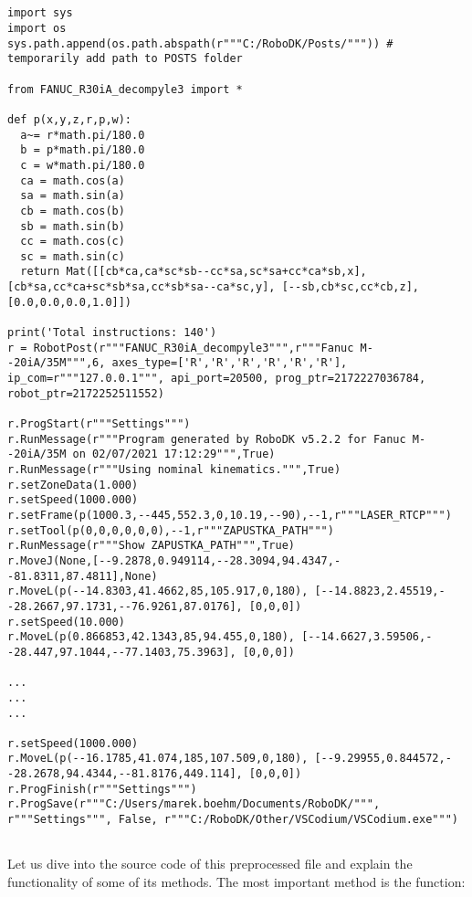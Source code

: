 \begin{lstlisting}[numbers=none,caption={Code snippet of preprocessed program to be executed by post processor},captionpos=b,label={code:preprocessed_python}, language={}]


import sys
import os
sys.path.append(os.path.abspath(r"""C:/RoboDK/Posts/""")) # temporarily add path to POSTS folder

from FANUC_R30iA_decompyle3 import *

def p(x,y,z,r,p,w):
  a~= r*math.pi/180.0
  b = p*math.pi/180.0
  c = w*math.pi/180.0
  ca = math.cos(a)
  sa = math.sin(a)
  cb = math.cos(b)
  sb = math.sin(b)
  cc = math.cos(c)
  sc = math.sin(c)
  return Mat([[cb*ca,ca*sc*sb--cc*sa,sc*sa+cc*ca*sb,x], [cb*sa,cc*ca+sc*sb*sa,cc*sb*sa--ca*sc,y], [--sb,cb*sc,cc*cb,z], [0.0,0.0,0.0,1.0]])

print('Total instructions: 140')
r = RobotPost(r"""FANUC_R30iA_decompyle3""",r"""Fanuc M--20iA/35M""",6, axes_type=['R','R','R','R','R','R'], ip_com=r"""127.0.0.1""", api_port=20500, prog_ptr=2172227036784, robot_ptr=2172252511552)

r.ProgStart(r"""Settings""")
r.RunMessage(r"""Program generated by RoboDK v5.2.2 for Fanuc M--20iA/35M on 02/07/2021 17:12:29""",True)
r.RunMessage(r"""Using nominal kinematics.""",True)
r.setZoneData(1.000)
r.setSpeed(1000.000)
r.setFrame(p(1000.3,--445,552.3,0,10.19,--90),--1,r"""LASER_RTCP""")
r.setTool(p(0,0,0,0,0,0),--1,r"""ZAPUSTKA_PATH""")
r.RunMessage(r"""Show ZAPUSTKA_PATH""",True)
r.MoveJ(None,[--9.2878,0.949114,--28.3094,94.4347,--81.8311,87.4811],None)
r.MoveL(p(--14.8303,41.4662,85,105.917,0,180), [--14.8823,2.45519,--28.2667,97.1731,--76.9261,87.0176], [0,0,0])
r.setSpeed(10.000)
r.MoveL(p(0.866853,42.1343,85,94.455,0,180), [--14.6627,3.59506,--28.447,97.1044,--77.1403,75.3963], [0,0,0])

...
...
...

r.setSpeed(1000.000)
r.MoveL(p(--16.1785,41.074,185,107.509,0,180), [--9.29955,0.844572,--28.2678,94.4344,--81.8176,449.114], [0,0,0])
r.ProgFinish(r"""Settings""")
r.ProgSave(r"""C:/Users/marek.boehm/Documents/RoboDK/""", r"""Settings""", False, r"""C:/RoboDK/Other/VSCodium/VSCodium.exe""")


\end{lstlisting}





Let us dive into the source code of this preprocessed file and explain the functionality of some of its methods. The most important method is the  function:

